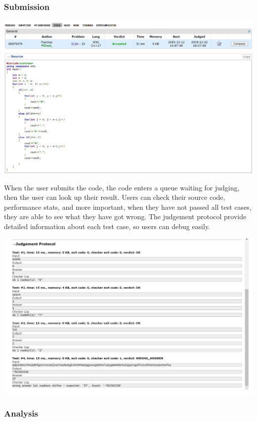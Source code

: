\documentclass[a4paper]{report}
\begin{document}
\subsubsection{Submission}

\includegraphics[width=\linewidth]{Submission-66675479-Codeforces}

When the user submits the code, the code enters a queue waiting for judging, then the user can look up their result. Users can check their source code, performance stats, and more important, when they have not passed all test cases, they are able to see what they have got wrong. The judgement protocol provide detailed information about each test case, so users can debug easily.

\includegraphics[width=\linewidth]{Judgement-Protocol-Codeforces}

\subsubsection{Analysis}
\end{document}
